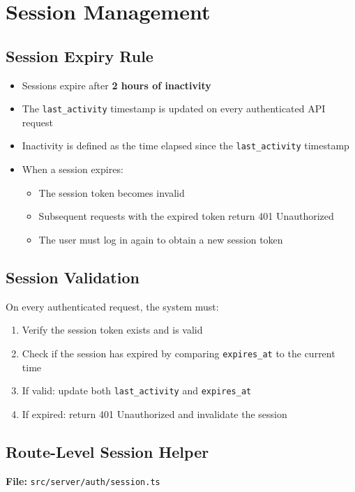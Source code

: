 \documentclass[11pt,a4paper]{article}
\begin{document}
\section{Session Management}

\subsection{Session Expiry Rule}
\begin{itemize}
    \item Sessions expire after \textbf{2 hours of inactivity}
    \item The \texttt{last\_activity} timestamp is updated on every authenticated API request
    \item Inactivity is defined as the time elapsed since the \texttt{last\_activity} timestamp
    \item When a session expires:
    \begin{itemize}
        \item The session token becomes invalid
        \item Subsequent requests with the expired token return 401 Unauthorized
        \item The user must log in again to obtain a new session token
    \end{itemize}
\end{itemize}

\subsection{Session Validation}
On every authenticated request, the system must:
\begin{enumerate}
    \item Verify the session token exists and is valid
    \item Check if the session has expired by comparing \texttt{expires\_at} to the current time
    \item If valid: update both \texttt{last\_activity} and \texttt{expires\_at}
    \item If expired: return 401 Unauthorized and invalidate the session
\end{enumerate}

\subsection{Route-Level Session Helper}
\textbf{File:} \texttt{src/server/auth/session.ts}
\end{document}
